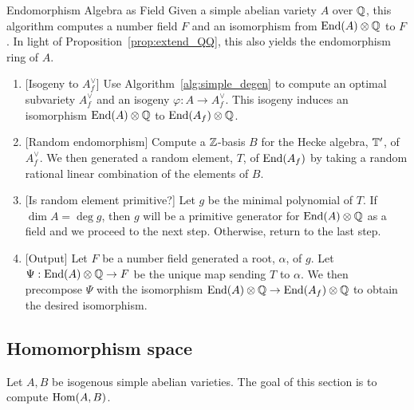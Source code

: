 \begin{algorithm}{Endomorphism Algebra as Field}
    \label{alg:end_A}
    Given a simple abelian variety $A$ over $\mathbb{Q}$, this algorithm computes a
    number field $F$ and an isomorphism from $\operatorname{End}(A)\otimes \mathbb{Q}$ to $F$. In
    light of Proposition~\ref{prop:extend_QQ}, this also yields the
    endomorphism ring of $A$.
    \begin{enumerate}
        \item{} [Isogeny to $A_f ^\vee$]
            Use Algorithm~\ref{alg:simple_degen} to compute an optimal subvariety
            $A_f ^\vee$ and an isogeny $\varphi:A\to A_f ^\vee$. This isogeny
            induces an isomorphism $\operatorname{End}(A)\otimes\mathbb{Q}$ to $\operatorname{End}(A_f)\otimes
            \mathbb{Q}$.
        \item{} [Random endomorphism]
            Compute a $\mathbb{Z}$-basis $B$ for the Hecke
            algebra, $\mathbb{T}'$, of $A_f ^\vee$. We then generated a random
            element, $T$, of $\operatorname{End}(A_f)$ by taking a random rational linear
            combination of the elements of $B$.
        \item{} [Is random element primitive?]
            Let $g$ be the minimal polynomial of $T$. If $\dim A = \deg g$,
            then $g$ will be a primitive generator for $\operatorname{End}(A)\otimes \mathbb{Q}$ as
            a field and we proceed to the next step. Otherwise, return to the
            last step.
        \item{} [Output]
            Let $F$ be a number field generated a root, $\alpha$, of $g$. Let
            $\Psi:\operatorname{End}(A)\otimes \mathbb{Q}\to F$ be the unique map sending $T$ to
            $\alpha$. We then precompose $\Psi$ with the isomorphism
            $\operatorname{End}(A)\otimes \mathbb{Q} \to \operatorname{End}(A_f)\otimes \mathbb{Q}$ to obtain the
            desired isomorphism.
    \end{enumerate}
\end{algorithm}

\subsection{Homomorphism space}%
\label{sub:_hom_a_b_}

Let $A, B$ be isogenous simple abelian varieties. The goal of this section is
to compute $\operatorname{Hom}(A,B)$.

